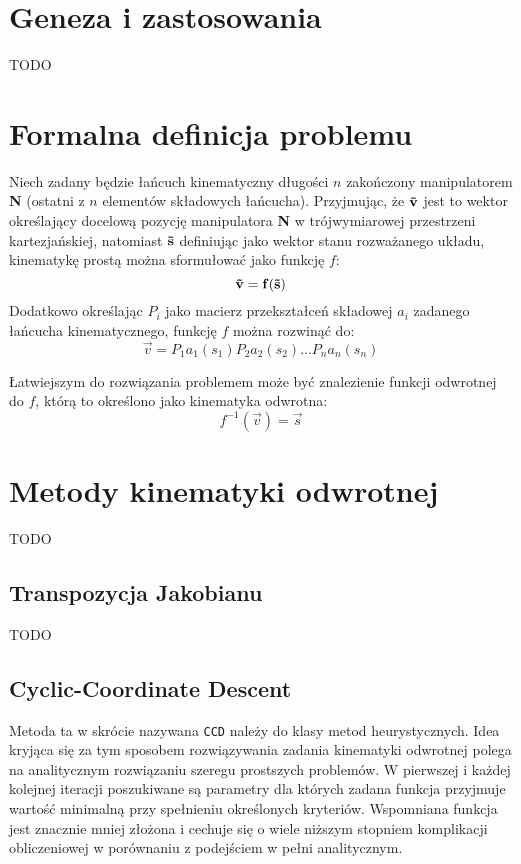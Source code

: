 \documentclass[11pt]{mwrep}
\begin{document}

  \section{Geneza i zastosowania}
    
TODO

  
\section{Formalna definicja problemu}

 Niech zadany będzie łańcuch kinematyczny długości $n$ zakończony manipulatorem \textbf{N} (ostatni z $n$ elementów składowych łańcucha). Przyjmując, że $\bf\vec{v}$ jest to wektor określający docelową pozycję manipulatora \textbf{N} w trójwymiarowej przestrzeni kartezjańskiej, natomiast $\bf\vec{s}$ definiując jako wektor stanu rozważanego układu, kinematykę prostą można sformułować jako funkcję $f$:
$$
\bf\vec{v} = f(\bf\vec{s})
$$
Dodatkowo określając $P_i$ jako macierz przekształceń składowej $a_i$ zadanego łańcucha kinematycznego, funkcję $f$ można rozwinąć do:
$$
{\vec{v}} = P_1a_1({s_1})P_2a_2({s_2}) \dots P_na_n({s_n})
$$

Łatwiejszym do rozwiązania problemem może być znalezienie funkcji odwrotnej do $f$, którą to określono jako kinematyka odwrotna:
$$
f^{-1} (\vec{v})  = \vec{s}
$$


  \section{Metody kinematyki odwrotnej}

    TODO


    \subsection{Transpozycja Jakobianu}

     TODO
 
    \subsection{Cyclic-Coordinate Descent}

  Metoda ta w skrócie nazywana \texttt{CCD} należy do klasy metod heurystycznych. Idea kryjąca się za tym sposobem rozwiązywania zadania kinematyki odwrotnej polega na analitycznym rozwiązaniu szeregu prostszych problemów. W pierwszej i każdej kolejnej iteracji poszukiwane są parametry dla których zadana funkcja przyjmuje wartość minimalną przy spełnieniu określonych kryteriów. Wspomniana funkcja jest znacznie mniej złożona i cechuje się o wiele niższym stopniem komplikacji obliczeniowej w porównaniu z podejściem w pełni analitycznym.
\end{document}
